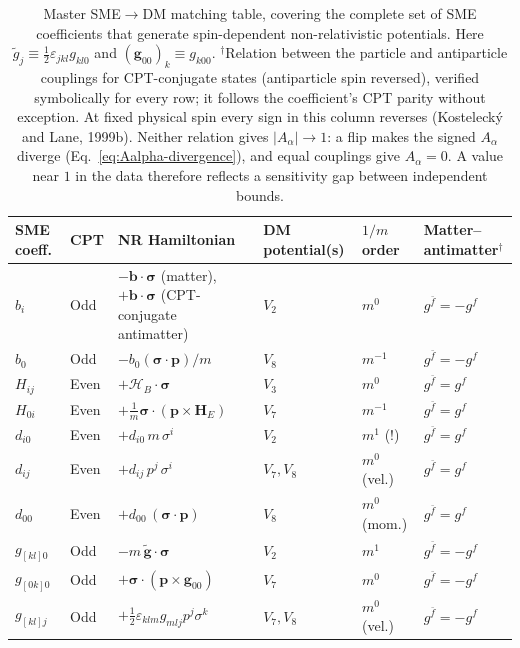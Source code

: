 \begin{table}[h]
\centering
\small
\begin{tabular}{@{}l l >{\raggedright\arraybackslash}p{3.3cm} l l >{\raggedright\arraybackslash}p{3cm}@{}}
\toprule
SME coeff. & CPT & NR Hamiltonian & DM potential(s) & $1/m$ order & Matter--antimatter$^\dagger$ \\
\midrule
$b_i$ & Odd & $-\mathbf b\cdot\boldsymbol\sigma$ (matter), $+\mathbf b\cdot\boldsymbol\sigma$ (CPT-conjugate antimatter) & $V_2$ & $m^0$ & $g^{\bar f}=-g^{f}$ \\
$b_0$ & Odd & $-b_0(\boldsymbol\sigma\cdot\mathbf p)/m$ & $V_8$ & $m^{-1}$ & $g^{\bar f}=-g^{f}$ \\
$H_{ij}$ & Even & $+\boldsymbol{\mathcal H}_B\cdot\boldsymbol\sigma$ & $V_3$ & $m^0$ & $g^{\bar f}=g^{f}$ \\
$H_{0i}$ & Even & $+\tfrac1m\boldsymbol\sigma\cdot(\mathbf p\times\mathbf H_E)$ & $V_7$ & $m^{-1}$ & $g^{\bar f}=g^{f}$ \\
$d_{i0}$ & Even & $+d_{i0}\,m\,\sigma^i$ & $V_2$ & $m^1$ (!) & $g^{\bar f}=g^{f}$ \\
$d_{ij}$ & Even & $+d_{ij}\,p^j\,\sigma^i$ & $V_7, V_8$ & $m^0$ (vel.) & $g^{\bar f}=g^{f}$ \\
$d_{00}$ & Even & $+d_{00}\,(\boldsymbol\sigma\cdot\mathbf p)$ & $V_8$ & $m^0$ (mom.) & $g^{\bar f}=g^{f}$ \\
$g_{[kl]0}$ & Odd & $-m\,\tilde{\mathbf g}\cdot\boldsymbol\sigma$ & $V_2$ & $m^1$ & $g^{\bar f}=-g^{f}$ \\
$g_{[0k]0}$ & Odd & $+\boldsymbol\sigma\cdot(\mathbf p\times\mathbf g_{00})$ & $V_7$ & $m^0$ & $g^{\bar f}=-g^{f}$ \\
$g_{[kl]j}$ & Odd & $+\tfrac12\varepsilon_{klm}g_{mlj}p^j\sigma^k$ & $V_7, V_8$ & $m^0$ (vel.) & $g^{\bar f}=-g^{f}$ \\
\bottomrule
\end{tabular}
\caption{Master SME$\to$DM matching table, covering the complete set of SME
coefficients that generate spin-dependent non-relativistic potentials.
Here $\tilde g_j\equiv\tfrac12\varepsilon_{jkl}g_{kl0}$ and
$(\mathbf g_{00})_k\equiv g_{k00}$. $^\dagger$Relation between the particle and antiparticle couplings for
CPT-conjugate states (antiparticle spin reversed), verified symbolically
for every row; it follows the coefficient's CPT parity without exception.
At fixed physical spin every sign in this column reverses (Kostelecký and
Lane, 1999b). Neither relation gives $|A_\alpha|\to1$: a flip makes the
signed $A_\alpha$ diverge (Eq.~\ref{eq:Aalpha-divergence}), and equal
couplings give $A_\alpha=0$. A value near $1$ in the data therefore
reflects a sensitivity gap between independent bounds.}
\label{tab:master}
\end{table}

